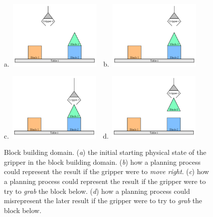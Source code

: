 \documentclass[twoside,letterpaper,11pt]{article}
\begin{document}
\begin{figure}[here]
\centering
a.~\includegraphics[width=0.4\textwidth]{block_building-1}~~b.~\includegraphics[width=0.4\textwidth]{block_building-2}

c.~\includegraphics[width=0.4\textwidth]{block_building-3}~~d.~\includegraphics[width=0.4\textwidth]{block_building-4}
\caption{Block building domain.  (\emph{a}) the initial starting
  physical state of the gripper in the block building domain.
  (\emph{b}) how a planning process could represent the result if the
  gripper were to \emph{move right}.  (\emph{c}) how a planning
  process could represent the result if the gripper were to try to
  \emph{grab} the block below.  (\emph{d}) how a planning process
  could misrepresent the later result if the gripper were to try to
  \emph{grab} the block below.  }
\label{fig:block_building_domain}
\end{figure}
\end{document}
